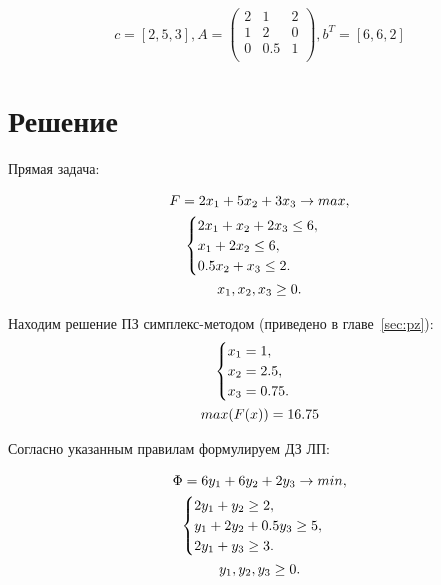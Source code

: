 \documentclass[12pt,a4paper,oneside]{extarticle}
\begin{document}
    $$c = [2, 5, 3], 
    A = \begin{pmatrix}
        2 & 1 & 2\\
        1 & 2 & 0\\
        0 & 0.5 & 1\\
    \end{pmatrix}, 
    b^T = [6, 6, 2]$$


\section{Решение}
    Прямая задача:

    \begin{gather}
        F = 2x_1+5x_2+3x_3 \rightarrow max,  \notag  \\
        \begin{cases}
            2x_1 + x_2 + 2x_3 \leq 6, \\
            x_1 + 2x_2 \leq 6, \\
            0.5x_2 + x_3 \leq 2.
        \end{cases} \notag \\
        x_1, x_2, x_3 \geq 0. \notag
    \end{gather} 

    Находим решение ПЗ симплекс-методом (приведено в главе~\ref{sec:pz}):
    \begin{gather}
        \begin{cases}
            x_1 = 1,\\
            x_2 = 2.5, \\
            x_3 = 0.75. \\
        \end{cases} \notag \\
        max (F(x)) = 16.75 \notag 
    \end{gather}

    Согласно указанным правилам формулируем ДЗ ЛП:

    \begin{gather}
        \Phi = 6y_1 + 6y_2 + 2y_3 \rightarrow min,  \notag  \\
        \begin{cases}
            2y_1 + y_2 \geq 2, \\
            y_1 + 2y_2 + 0.5y_3 \geq 5, \\
            2y_1 + y_3 \geq 3.
        \end{cases} \notag \\
        y_1, y_2, y_3 \geq 0. \notag
    \end{gather} 
\end{document}
